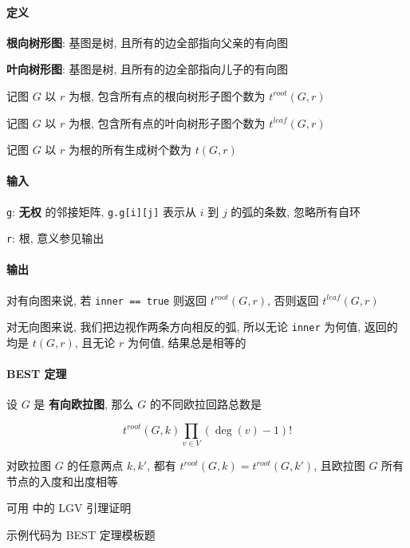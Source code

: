 \paragraph{定义}

\textbf{根向树形图}: 基图是树, 且所有的边全部指向父亲的有向图

\textbf{叶向树形图}: 基图是树, 且所有的边全部指向儿子的有向图

记图 \(G\) 以 \(r\) 为根, 包含所有点的根向树形子图个数为 \(t^{root}(G,r)\)

记图 \(G\) 以 \(r\) 为根, 包含所有点的叶向树形子图个数为 \(t^{leaf}(G,r)\)

记图 \(G\) 以 \(r\) 为根的所有生成树个数为 \(t(G,r)\)

\paragraph{输入}

\verb|g|: \textbf{无权} 的邻接矩阵, \verb|g.g[i][j]| 表示从 \(i\) 到 \(j\) 的弧的条数, 忽略所有自环

\verb|r|: 根, 意义参见输出

\paragraph{输出}

对有向图来说, 若 \verb|inner == true| 则返回 \(t^{root}(G,r)\), 否则返回 \(t^{leaf}(G,r)\)

对无向图来说, 我们把边视作两条方向相反的弧, 所以无论 \verb|inner| 为何值, 返回的均是 \(t(G,r)\), 且无论 \(r\) 为何值, 结果总是相等的

\paragraph{BEST 定理}

设 \(G\) 是 \textbf{有向欧拉图}, 那么 \(G\) 的不同欧拉回路总数是

\[
    t^{root}(G,k)\prod_{v\in V}(\deg (v) - 1)!
\]

对欧拉图 \(G\) 的任意两点 \(k, k'\), 都有 \(t^{root}(G,k)=t^{root}(G,k')\), 且欧拉图 \(G\) 所有节点的入度和出度相等

可用  中的 LGV 引理证明

示例代码为 BEST 定理模板题